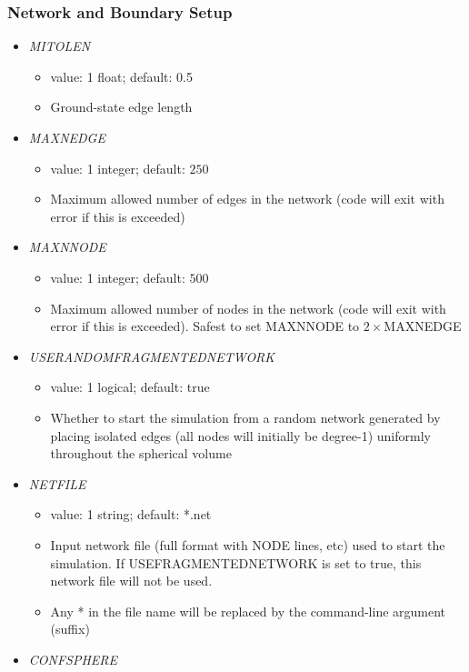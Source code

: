 \documentclass[12pt]{article}
\begin{document}
\subsubsection*{Network and Boundary Setup}
\begin{itemize}
%
\item {\it MITOLEN}
  \begin{itemize}
    \item  value: 1 float; default: 0.5
    \item Ground-state edge length
  \end{itemize}
%
\item {\it MAXNEDGE}
  \begin{itemize}
    \item  value: 1 integer; default: $250$
    \item Maximum allowed number of edges in the network (code will exit with error if this is exceeded)
  \end{itemize}
%
\item {\it MAXNNODE}
  \begin{itemize}
    \item  value: 1 integer; default: $500$
    \item Maximum allowed number of nodes in the network (code will exit with error if this is exceeded). Safest to set MAXNNODE to $2\times$MAXNEDGE
  \end{itemize}
%
\item {\it USERANDOMFRAGMENTEDNETWORK}
\begin{itemize}
  \item  value: 1 logical; default: true
  \item Whether to start the simulation from a random network generated by placing isolated edges (all nodes will initially be degree-1) uniformly throughout the spherical volume
\end{itemize}
%
\item {\it NETFILE}
  \begin{itemize}
    \item  value: 1 string; default: *.net
    \item Input network file (full format with NODE lines, etc) used to start the simulation. If USEFRAGMENTEDNETWORK is set to true, this network file will not be used.
    \item Any * in the file name will be replaced by the command-line argument (suffix)
  \end{itemize}
%
\item {\it CONFSPHERE}

\end{itemize}
\end{document}
